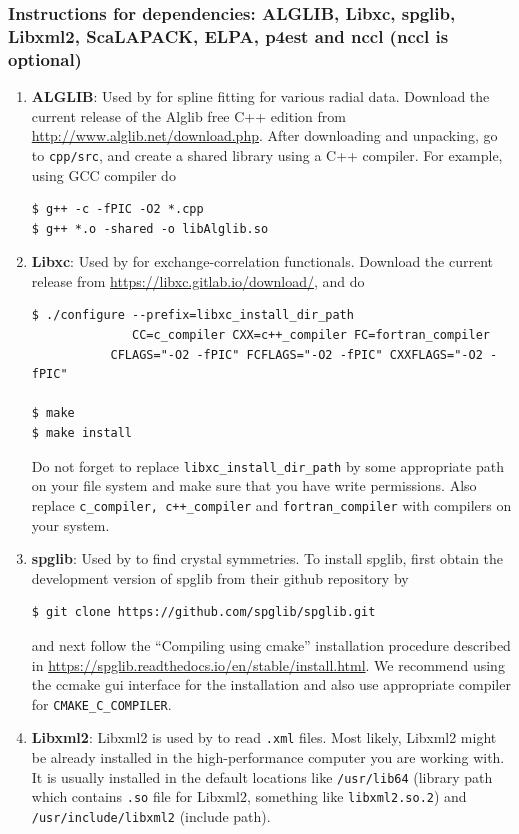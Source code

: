 \subsubsection{Instructions for dependencies: ALGLIB, Libxc, spglib, Libxml2, ScaLAPACK, ELPA, p4est and nccl (nccl is optional)}
\begin{enumerate}
	\item   {\bf ALGLIB}: Used by \dftfe{} for spline fitting for various radial data. Download the current release of the Alglib free C++ edition from \url{http://www.alglib.net/download.php}. After downloading and unpacking, go to \verb|cpp/src|, and create a shared library using a C++ compiler. For example, using GCC compiler do
\begin{verbatim}
$ g++ -c -fPIC -O2 *.cpp
$ g++ *.o -shared -o libAlglib.so
\end{verbatim}
\item {\bf Libxc}: Used by \dftfe{} for exchange-correlation functionals. Download the current release from \url{https://libxc.gitlab.io/download/}, and do 
\begin{verbatim}
$ ./configure --prefix=libxc_install_dir_path
              CC=c_compiler CXX=c++_compiler FC=fortran_compiler
	       CFLAGS="-O2 -fPIC" FCFLAGS="-O2 -fPIC" CXXFLAGS="-O2 -fPIC"
     
$ make
$ make install
\end{verbatim}
Do not forget to replace \verb|libxc_install_dir_path| by some appropriate path on your file system and make sure that you have write permissions. Also replace \verb|c_compiler, c++_compiler| and \verb|fortran_compiler| with compilers on your system.

\item {\bf spglib}: Used by \dftfe{} to find crystal symmetries. To install spglib, first obtain the development version of spglib from their github repository by
\begin{verbatim}
$ git clone https://github.com/spglib/spglib.git	
\end{verbatim}	
and next follow the ``Compiling using cmake'' installation procedure described in \url{https://spglib.readthedocs.io/en/stable/install.html}.   	
We recommend using the ccmake gui interface for the installation and also use appropriate compiler for \verb|CMAKE_C_COMPILER|.

\item {\bf Libxml2}: Libxml2 is used by \dftfe{} to read \verb|.xml| files. Most likely, Libxml2 might be already installed in the high-performance computer you are working with. It is usually installed in the default locations like \verb|/usr/lib64| (library path which contains \verb|.so| file for Libxml2, something like \verb|libxml2.so.2|) and \verb|/usr/include/libxml2| (include path). 


\end{enumerate}
